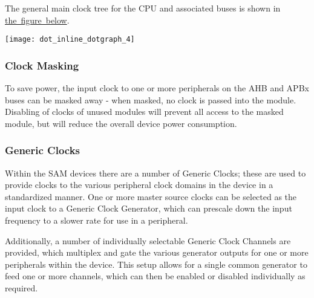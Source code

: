 The general main clock tree for the C\+PU and associated buses is shown in \mbox{\hyperlink{group__asfdoc__sam0__system__clock__group_asfdoc_sam0_system_clock_module_clock_tree}{the figure below}}.

\label{group__asfdoc__sam0__system__clock__group_asfdoc_sam0_system_clock_module_clock_tree}%
%

\begin{DoxyImageNoCaption}
  \mbox{\texttt{[image: dot\_inline\_dotgraph\_4]}}
\end{DoxyImageNoCaption}
\hypertarget{group__asfdoc__sam0__system__clock__group_asfdoc_sam0_system_clock_module_overview_clock_masking}{}\subsubsection{Clock Masking}\label{group__asfdoc__sam0__system__clock__group_asfdoc_sam0_system_clock_module_overview_clock_masking}
To save power, the input clock to one or more peripherals on the A\+HB and A\+P\+Bx buses can be masked away -\/ when masked, no clock is passed into the module. Disabling of clocks of unused modules will prevent all access to the masked module, but will reduce the overall device power consumption.\hypertarget{group__asfdoc__sam0__system__clock__group_asfdoc_sam0_system_clock_module_overview_gclk}{}\subsubsection{Generic Clocks}\label{group__asfdoc__sam0__system__clock__group_asfdoc_sam0_system_clock_module_overview_gclk}
Within the S\+AM devices there are a number of Generic Clocks; these are used to provide clocks to the various peripheral clock domains in the device in a standardized manner. One or more master source clocks can be selected as the input clock to a Generic Clock Generator, which can prescale down the input frequency to a slower rate for use in a peripheral.

Additionally, a number of individually selectable Generic Clock Channels are provided, which multiplex and gate the various generator outputs for one or more peripherals within the device. This setup allows for a single common generator to feed one or more channels, which can then be enabled or disabled individually as required.

\label{group__asfdoc__sam0__system__clock__group_asfdoc_sam0_system_clock_module_chain_overview}%
%

